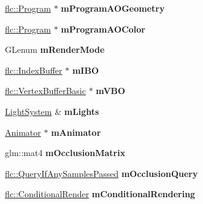 \begin{DoxyCompactItemize}
\hyperlink{classflw_1_1flc_1_1Program}{flc\+::\+Program} $\ast$ {\bfseries m\+Program\+A\+O\+Geometry}
\item 
\mbox{\label{classflw_1_1flf_1_1Mesh_a5abfbf579d59bbe86b4ccaf578e3209c}} 
\hyperlink{classflw_1_1flc_1_1Program}{flc\+::\+Program} $\ast$ {\bfseries m\+Program\+A\+O\+Color}
\item 
\mbox{\label{classflw_1_1flf_1_1Mesh_ac5a5be3a00bbac56bbd62ba3b768a4a7}} 
G\+Lenum {\bfseries m\+Render\+Mode}
\item 
\mbox{\label{classflw_1_1flf_1_1Mesh_a7cd12a73f7d222e08091b02bd33ff389}} 
\hyperlink{classflw_1_1flc_1_1IndexBuffer}{flc\+::\+Index\+Buffer} $\ast$ {\bfseries m\+I\+BO}
\item 
\mbox{\label{classflw_1_1flf_1_1Mesh_ae4e1bd89cf84431e5b7eeaed6da03e6f}} 
\hyperlink{classflw_1_1flc_1_1VertexBufferBasic}{flc\+::\+Vertex\+Buffer\+Basic} $\ast$ {\bfseries m\+V\+BO}
\item 
\mbox{\label{classflw_1_1flf_1_1Mesh_abf1627629b9770728f7801f000bddab9}} 
\hyperlink{classflw_1_1flf_1_1LightSystem}{Light\+System} \& {\bfseries m\+Lights}
\item 
\mbox{\label{classflw_1_1flf_1_1Mesh_ac917370aff240f18d2c93629efcba62c}} 
\hyperlink{classflw_1_1flf_1_1Animator}{Animator} $\ast$ {\bfseries m\+Animator}
\item 
\mbox{\label{classflw_1_1flf_1_1Mesh_a630471a66bf49d393def1de93adb0fd7}} 
glm\+::mat4 {\bfseries m\+Occlusion\+Matrix}
\item 
\mbox{\label{classflw_1_1flf_1_1Mesh_ab29e5683116d160cf7500e21a1206d9b}} 
\hyperlink{classflw_1_1flc_1_1TQuery}{flc\+::\+Query\+If\+Any\+Samples\+Passed} {\bfseries m\+Occlusion\+Query}
\item 
\mbox{\label{classflw_1_1flf_1_1Mesh_a30f0ef3434338cfffa756583587d37ff}} 
\hyperlink{classflw_1_1flc_1_1ConditionalRender}{flc\+::\+Conditional\+Render} {\bfseries m\+Conditional\+Rendering}
\end{DoxyCompactItemize}
